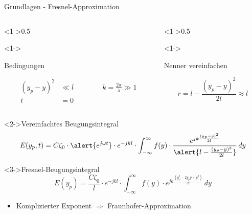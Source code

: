 \begin{frame}{Grundlagen - Fresnel-Approximation}
    \begin{columns}
        \begin{column}<1->{0.5\textwidth}
            \begin{alertblock}<1->{\strut Bedingungen}
                \begin{align*}
                    (y_p - y)^2
                    &\ll
                    l \qquad\qquad k
                    =
                    \frac{2\pi}{\lambda}
                    \gg
                    1
                    \\
                    t
                    &=
                    0
                \end{align*}
            \end{alertblock}
        \end{column}
        \begin{column}<1->{0.5\textwidth}
            \begin{block}<1->{\strut Nenner vereinfachen}
                \begin{equation*}
                    r
                    =
                    l - \frac{(y_p-y)^2}{2l}
                    \approx
                    l
                \end{equation*}
            \end{block}
        \end{column}
    \end{columns}

    \begin{block}<2->{Vereinfachtes Beugungsintegral}
        \begin{equation*}
            E(y_p, t)
            =
            C\zeta_0 \cdot \alert{e^{j\omega t}} \cdot e^{-jkl} \cdot \int_{-\infty}^{\infty}f(y)\cdot\frac{e^{jk\frac{(y_p-y)^2}{2l}}}{\alert{l - \frac{(y_p-y)^2}{2l}}} \,dy
        \end{equation*}
    \end{block}
    \begin{exampleblock}<3->{Fresnel-Beugungsintegral}
        \begin{equation*}
            E(y_p)
            =
            \frac{C\zeta_0}{l} \cdot e^{-jkl} \cdot \int_{-\infty}^{\infty}f(y)\cdot e^{jk\frac{(y_p^2 - 2y_py + y^2)}{2l}} \,dy
        \end{equation*}
        \begin{itemize}
            \item<4-> Komplizierter Exponent $\Rightarrow$ Fraunhofer-Approximation
        \end{itemize}

    \end{exampleblock}
\end{frame}

